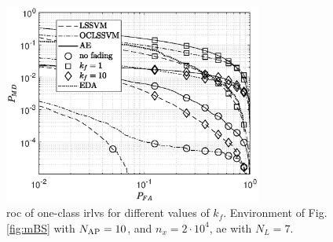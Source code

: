 \documentclass[final,twocolumn]{IEEEtran}
\begin{document}
\begin{figure}[t]
    \centering
    \includegraphics[width=8.5cm]{res_Fading_new_10BS_oneClass.eps}
    \caption{\ac{roc} of one-class \acp{irlv} for different values of $k_f$. Environment of Fig. \ref{fig:mBS} with $N_{\rm AP}=10$, and $n_x= 2 \cdot 10^4$,  \ac{ae} with $N_L = 7$.  }
    \label{fig:kf10Oc}
\end{figure}





\end{document}
